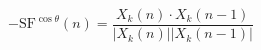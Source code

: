 \documentclass{article}
\begin{document}
 
\[
 - \mbox{SF}^{\cos \theta}(n) =  \frac{X_k(n) \cdot X_k(n-1)}
   {|X_k(n)| |X_k(n-1)| } 
\]
 \newpage 
\end{document}
